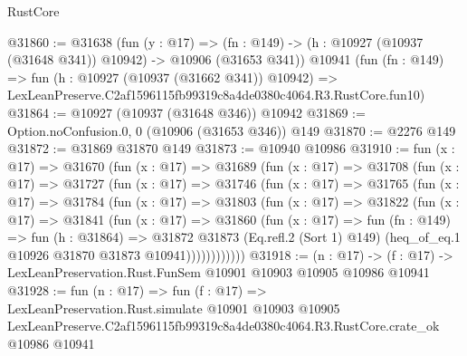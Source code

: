 \begin{lexlean}{RustCore}
\begin{coremodule}
@31860 := @31638
    (fun (y : @17) =>
    (fn : @149) -> (h : @10927 (@10937 (@31648 @341)) @10942) -> @10906 (@31653 @341))
    @10941
    (fun (fn : @149) =>
    fun (h : @10927 (@10937 (@31662 @341)) @10942) =>
    LexLeanPreserve.C2af1596115fb99319c8a4de0380c4064.R3.RustCore.fun10)
@31864 := @10927 (@10937 (@31648 @346)) @10942
@31869 := Option.noConfusion.{0, 0} (@10906 (@31653 @346)) @149
@31870 := @2276 @149
@31872 := @31869 @31870 @149
@31873 := @10940 @10986
@31910 := fun (x : @17) =>
  @31670
    (fun (x : @17) =>
    @31689
      (fun (x : @17) =>
      @31708
        (fun (x : @17) =>
        @31727
          (fun (x : @17) =>
          @31746
            (fun (x : @17) =>
            @31765
              (fun (x : @17) =>
              @31784
                (fun (x : @17) =>
                @31803
                  (fun (x : @17) =>
                  @31822
                    (fun (x : @17) =>
                    @31841
                      (fun (x : @17) =>
                      @31860
                        (fun (x : @17) =>
                        fun (fn : @149) =>
                        fun (h : @31864) =>
                        @31872
                          @31873
                          (Eq.refl.{2} (Sort 1) @149)
                          (heq_of_eq.{1} @10926 @31870 @31873 @10941))))))))))))
@31918 := (n : @17) ->
  (f : @17) -> LexLeanPreservation.Rust.FunSem @10901 @10903 @10905 @10986 @10941
@31928 := fun (n : @17) =>
  fun (f : @17) =>
  LexLeanPreservation.Rust.simulate
    @10901
    @10903
    @10905
    LexLeanPreserve.C2af1596115fb99319c8a4de0380c4064.R3.RustCore.crate_ok
    @10986
    @10941
\end{coremodule}
\end{lexlean}
